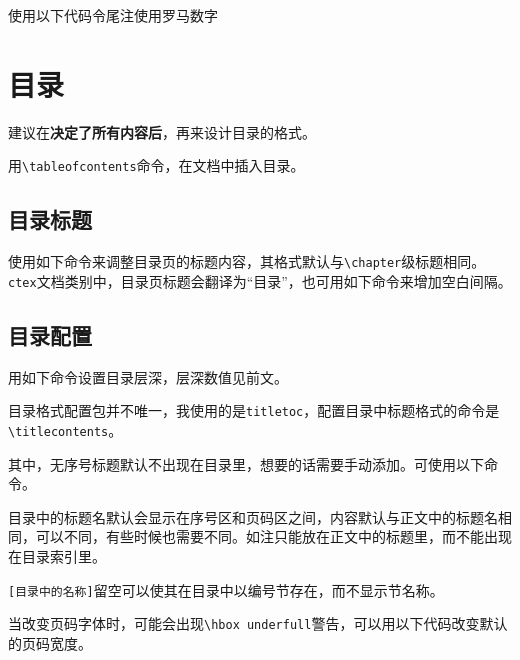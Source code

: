 \documentclass[10pt,openany]{book}
\begin{document}
使用以下代码令尾注使用罗马数字



\chapter{目录}

建议在\textbf{决定了所有内容后}，再来设计目录的格式。

用\texttt{\textbackslash{}tableofcontents}命令，在文档中插入目录。

\section{目录标题}

使用如下命令来调整目录页的标题内容，其格式默认与\texttt{\textbackslash{}chapter}级标题相同。\texttt{ctex}文档类别中，目录页标题会翻译为“目录”，也可用如下命令来增加空白间隔。



\section{目录配置}

用如下命令设置目录层深，层深数值见前文。



目录格式配置包并不唯一，我使用的是\texttt{titletoc}，配置目录中标题格式的命令是\texttt{\textbackslash{}titlecontents}。



其中，无序号标题默认不出现在目录里，想要的话需要手动添加。可使用以下命令。



目录中的标题名默认会显示在序号区和页码区之间，内容默认与正文中的标题名相同，可以不同，有些时候也需要不同。如注只能放在正文中的标题里，而不能出现在目录索引里。



\texttt{[目录中的名称]}留空可以使其在目录中以编号节存在，而不显示节名称。

当改变页码字体时，可能会出现\texttt{\textbackslash{}hbox\ underfull}警告，可以用以下代码改变默认的页码宽度。
\end{document}
